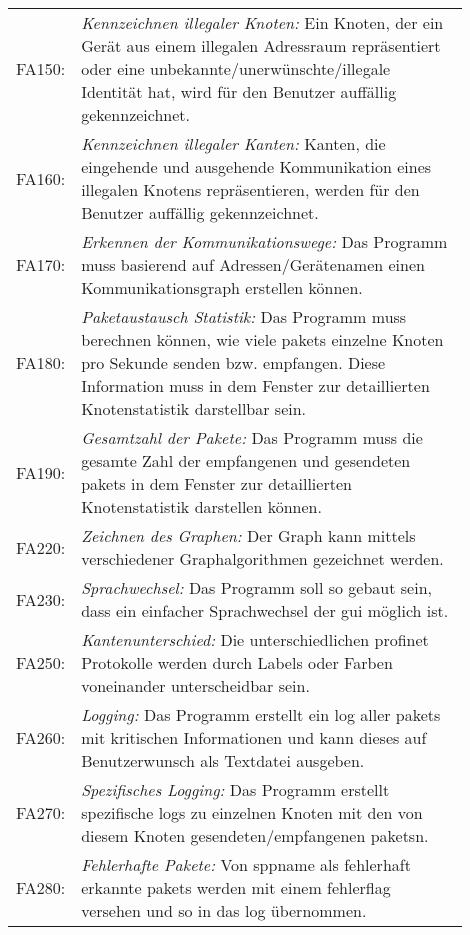 \begin{longtable}{lp{0.9\linewidth}}
FA150: & \textit{Kennzeichnen illegaler Knoten: }Ein Knoten, der ein Gerät aus einem illegalen Adressraum repräsentiert oder eine unbekannte/unerwünschte/illegale Identität hat, wird für den Benutzer auffällig gekennzeichnet. \\

FA160: & \textit{Kennzeichnen illegaler Kanten: }Kanten, die eingehende und ausgehende Kommunikation eines illegalen Knotens repräsentieren, werden für den Benutzer auffällig gekennzeichnet. \\

FA170: & \textit{Erkennen der Kommunikationswege: }Das Programm muss basierend auf Adressen/Gerätenamen einen Kommunikationsgraph erstellen können. \\

FA180: & \textit{Paketaustausch Statistik: }Das Programm muss berechnen können, wie viele \glspl{paket} einzelne Knoten pro Sekunde senden bzw. empfangen. Diese Information muss in dem Fenster zur detaillierten Knotenstatistik darstellbar sein. \\

FA190: & \textit{Gesamtzahl der Pakete: }Das Programm muss die gesamte Zahl der empfangenen und gesendeten \glspl{paket} in dem Fenster zur detaillierten Knotenstatistik darstellen können. \\

FA220: & \textit{Zeichnen des Graphen: }Der Graph kann mittels verschiedener Graphalgorithmen gezeichnet werden. \\

FA230: & \textit{Sprachwechsel: }Das Programm soll so gebaut sein, dass ein einfacher Sprachwechsel der \gls{gui} möglich ist. \\

FA250: & \textit{Kantenunterschied: }Die unterschiedlichen \gls{profinet} Protokolle werden durch Labels oder Farben voneinander unterscheidbar sein. \\

FA260: & \textit{Logging: }Das Programm erstellt ein \gls{log} aller \glspl{paket} mit kritischen Informationen und kann dieses auf Benutzerwunsch als Textdatei ausgeben. \\

FA270: & \textit{Spezifisches Logging: }Das Programm erstellt spezifische \glspl{log} zu einzelnen Knoten mit den von diesem Knoten gesendeten/empfangenen \glspl{paket}n. \\

FA280: & \textit{Fehlerhafte Pakete: }Von \gls{sppname} als fehlerhaft erkannte \glspl{paket} werden mit einem \gls{fehlerflag} versehen und so in das \gls{log} übernommen.

\end{longtable}

